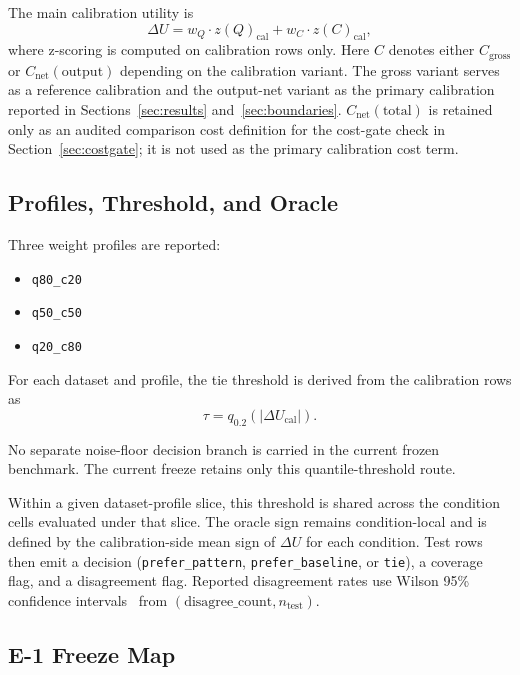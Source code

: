 \documentclass[11pt,a4paper]{article}
\begin{document}
The main calibration utility is
\[
\Delta U = w_Q \cdot z(Q)_{\mathrm{cal}} + w_C \cdot z(C)_{\mathrm{cal}},
\]
where z-scoring is computed on calibration rows only.
Here $C$ denotes either $C_{\mathrm{gross}}$ or $C_{\mathrm{net}}(\mathrm{output})$ depending on the calibration variant.
The gross variant serves as a reference calibration and the output-net variant as
the primary calibration reported in Sections~\ref{sec:results}
and~\ref{sec:boundaries}. $C_{\mathrm{net}}(\mathrm{total})$ is retained only as
an audited comparison cost definition for the cost-gate check in
Section~\ref{sec:costgate}; it is not used as the primary calibration cost term.

\subsection{Profiles, Threshold, and Oracle}
\label{sec:profiles}

Three weight profiles are reported:
\begin{itemize}
  \item \texttt{q80\_c20}
  \item \texttt{q50\_c50}
  \item \texttt{q20\_c80}
\end{itemize}

For each dataset and profile, the tie threshold is derived from the
calibration rows as
\[
\tau = q_{0.2}\left(|\Delta U_{\mathrm{cal}}|\right).
\]

No separate noise-floor decision branch is carried in the current frozen
benchmark. The current freeze retains only this quantile-threshold route.

Within a given dataset-profile slice, this threshold is shared across the
condition cells evaluated under that slice. The oracle sign remains
condition-local and is defined by the calibration-side mean sign of $\Delta U$
for each condition. Test rows then emit a decision
(\texttt{prefer\_pattern}, \texttt{prefer\_baseline}, or \texttt{tie}), a
coverage flag, and a disagreement flag. Reported disagreement rates use Wilson
95\% confidence intervals~\cite{wilson1927} from
$(\mathrm{disagree\_count}, n_{\mathrm{test}})$.

\subsection{E-1 Freeze Map}
\end{document}
